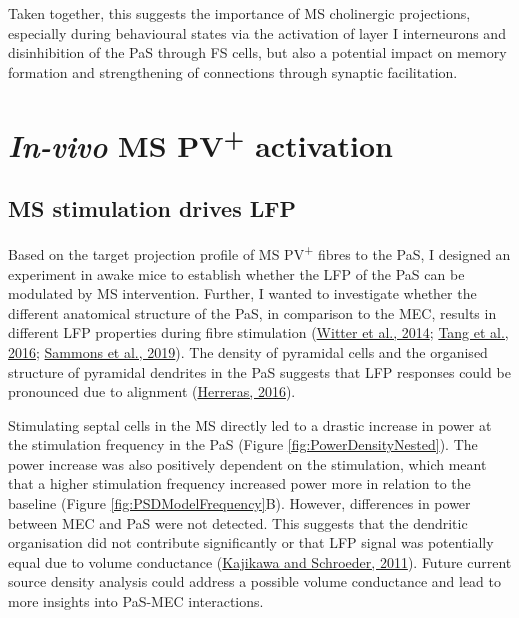 \documentclass[
  12pt,
  a4paper,
  openany]{book}
\begin{document}
Taken together, this suggests the importance of MS cholinergic projections, especially during behavioural states via the activation of layer I interneurons and disinhibition of the PaS through FS cells, but also a potential impact on memory formation and strengthening of connections through synaptic facilitation.

\hypertarget{in-vivo-ms-pv-activation}{%
\section{\texorpdfstring{\emph{In-vivo} MS PV\textsuperscript{+} activation}{In-vivo MS PV+ activation}}\label{in-vivo-ms-pv-activation}}

\hypertarget{ms-stimulation-drives-lfp}{%
\subsection{MS stimulation drives LFP}\label{ms-stimulation-drives-lfp}}

Based on the target projection profile of MS PV\textsuperscript{+} fibres to the PaS, I designed an experiment in awake mice to establish whether the LFP of the PaS can be modulated by MS intervention. Further, I wanted to investigate whether the different anatomical structure of the PaS, in comparison to the MEC, results in different LFP properties during fibre stimulation (\protect\hyperlink{ref-witter_architecture_2014}{Witter et al., 2014}; \protect\hyperlink{ref-tang_functional_2016}{Tang et al., 2016}; \protect\hyperlink{ref-sammons_electrophysiological_2019}{Sammons et al., 2019}). The density of pyramidal cells and the organised structure of pyramidal dendrites in the PaS suggests that LFP responses could be pronounced due to alignment (\protect\hyperlink{ref-herreras_local_2016}{Herreras, 2016}).

Stimulating septal cells in the MS directly led to a drastic increase in power at the stimulation frequency in the PaS (Figure \ref{fig:PowerDensityNested}). The power increase was also positively dependent on the stimulation, which meant that a higher stimulation frequency increased power more in relation to the baseline (Figure \ref{fig:PSDModelFrequency}B). However, differences in power between MEC and PaS were not detected. This suggests that the dendritic organisation did not contribute significantly or that LFP signal was potentially equal due to volume conductance (\protect\hyperlink{ref-kajikawa_how_2011}{Kajikawa and Schroeder, 2011}). Future current source density analysis could address a possible volume conductance and lead to more insights into PaS-MEC interactions.
\end{document}
